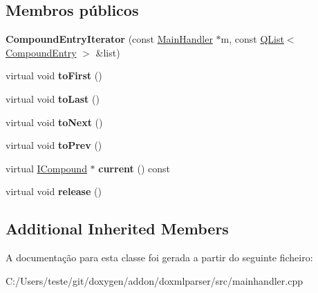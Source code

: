 \subsection*{Membros públicos}
\begin{DoxyCompactItemize}
\item 
\hypertarget{class_compound_entry_iterator_afaa091fb3cd3b2b418e16821670b6f6c}{{\bfseries Compound\-Entry\-Iterator} (const \hyperlink{class_main_handler}{Main\-Handler} $\ast$m, const \hyperlink{class_q_list}{Q\-List}$<$ \hyperlink{struct_compound_entry}{Compound\-Entry} $>$ \&list)}\label{class_compound_entry_iterator_afaa091fb3cd3b2b418e16821670b6f6c}

\item 
\hypertarget{class_compound_entry_iterator_a24528c52410032763cedaccdfbe474e5}{virtual void {\bfseries to\-First} ()}\label{class_compound_entry_iterator_a24528c52410032763cedaccdfbe474e5}

\item 
\hypertarget{class_compound_entry_iterator_ac4e23694db19ee84c4e110f9965d64e4}{virtual void {\bfseries to\-Last} ()}\label{class_compound_entry_iterator_ac4e23694db19ee84c4e110f9965d64e4}

\item 
\hypertarget{class_compound_entry_iterator_ad8ecebd1a267185e69e1b6fe4e9f331e}{virtual void {\bfseries to\-Next} ()}\label{class_compound_entry_iterator_ad8ecebd1a267185e69e1b6fe4e9f331e}

\item 
\hypertarget{class_compound_entry_iterator_a3491dc4d8ab54f0a0583ac1941f4e94f}{virtual void {\bfseries to\-Prev} ()}\label{class_compound_entry_iterator_a3491dc4d8ab54f0a0583ac1941f4e94f}

\item 
\hypertarget{class_compound_entry_iterator_aed1ddf0744f763ffafe54f63da2080bb}{virtual \hyperlink{class_i_compound}{I\-Compound} $\ast$ {\bfseries current} () const }\label{class_compound_entry_iterator_aed1ddf0744f763ffafe54f63da2080bb}

\item 
\hypertarget{class_compound_entry_iterator_af8a84115de3507728d5e19e804529052}{virtual void {\bfseries release} ()}\label{class_compound_entry_iterator_af8a84115de3507728d5e19e804529052}

\end{DoxyCompactItemize}
\subsection*{Additional Inherited Members}


A documentação para esta classe foi gerada a partir do seguinte ficheiro\-:\begin{DoxyCompactItemize}
\item 
C\-:/\-Users/teste/git/doxygen/addon/doxmlparser/src/mainhandler.\-cpp\end{DoxyCompactItemize}
